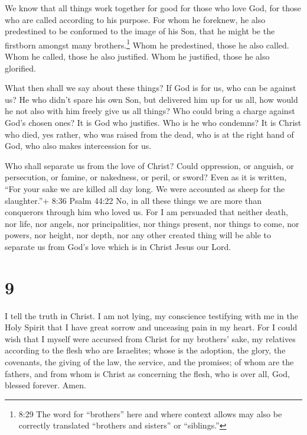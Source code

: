  We know that all things work together for good for those
who love God, for those who are called according to his purpose.
 For whom he foreknew, he also predestined to be conformed
to the image of his Son, that he might be the firstborn amongst many
brothers.\footnote{8:29 The word for ``brothers'' here and where context
  allows may also be correctly translated ``brothers and sisters'' or
  ``siblings.''}  Whom he predestined, those he also
called. Whom he called, those he also justified. Whom he justified,
those he also glorified.

 What then shall we say about these things? If God is for
us, who can be against us?  He who didn't spare his own
Son, but delivered him up for us all, how would he not also with him
freely give us all things?  Who could bring a charge
against God's chosen ones? It is God who justifies.  Who is
he who condemns? It is Christ who died, yes rather, who was raised from
the dead, who is at the right hand of God, who also makes intercession
for us.

 Who shall separate us from the love of Christ? Could
oppression, or anguish, or persecution, or famine, or nakedness, or
peril, or sword?  Even as it is written, ``For your sake we
are killed all day long. We were accounted as sheep for the
slaughter.''+ 8:36 Psalm 44:22  No, in all these things we
are more than conquerors through him who loved us.  For I
am persuaded that neither death, nor life, nor angels, nor
principalities, nor things present, nor things to come, nor powers,
 nor height, nor depth, nor any other created thing will be
able to separate us from God's love which is in Christ Jesus our Lord.

\hypertarget{section-8}{%
\section{9}\label{section-8}}

 I tell the truth in Christ. I am not lying, my conscience
testifying with me in the Holy Spirit  that I have great
sorrow and unceasing pain in my heart.  For I could wish
that I myself were accursed from Christ for my brothers' sake, my
relatives according to the flesh  who are Israelites; whose
is the adoption, the glory, the covenants, the giving of the law, the
service, and the promises;  of whom are the fathers, and
from whom is Christ as concerning the flesh, who is over all, God,
blessed forever. Amen.

